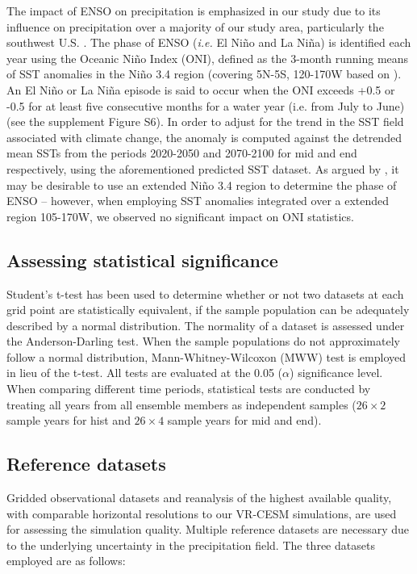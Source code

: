 \documentclass{ametsoc}
\begin{document}
The impact of ENSO on precipitation is emphasized in our study due to its influence on precipitation over a majority of our study area, particularly the southwest U.S. \citep{cayan1999enso, zhang2010influence, deser2012communication, yoon2015increasing}. The phase of ENSO (\textit{i.e.} El Ni\~no and La Ni\~na) is identified each year using the Oceanic Ni\~no Index (ONI), defined as the 3-month running means of SST anomalies in the Ni\~no 3.4 region (covering 5N-5S, 120-170W based on \cite{noaaElNino}). An El Ni\~no or La Ni\~na episode is said to occur when the ONI exceeds +0.5 or -0.5 for at least five consecutive months for a water year (i.e. from July to June) \citep{noaaElNino} (see the supplement Figure S6). In order to adjust for the trend in the SST field associated with climate change, the anomaly is computed against the detrended mean SSTs from the periods 2020-2050 and 2070-2100 for \textsf{mid} and \textsf{end} respectively, using the aforementioned predicted SST dataset. As argued by \cite{kao2009contrasting}, it may be desirable to use an extended Ni\~no 3.4 region to determine the phase of ENSO -- however, when employing SST anomalies integrated over a extended region 105-170W, we observed no significant impact on ONI statistics.


\subsection{Assessing statistical significance}

Student's t-test has been used to determine whether or not two datasets at each grid point are statistically equivalent, if the sample population can be adequately described by a normal distribution. The normality of a dataset is assessed under the Anderson-Darling test. When the sample populations do not approximately follow a normal distribution, Mann-Whitney-Wilcoxon (MWW) test is employed in lieu of the t-test. All tests are evaluated at the 0.05 ($\alpha$) significance level. When comparing different time periods, statistical tests are conducted by treating all years from all ensemble members as independent samples ($26 \times 2$ sample years for \textsf{hist} and $26 \times 4$ sample years for \textsf{mid} and \textsf{end}).


\subsection{Reference datasets}

Gridded observational datasets and reanalysis of the highest available quality, with comparable horizontal resolutions to our VR-CESM simulations, are used for assessing the simulation quality. Multiple reference datasets are necessary due to the underlying uncertainty in the precipitation field. The three datasets employed are as follows:
\end{document}

